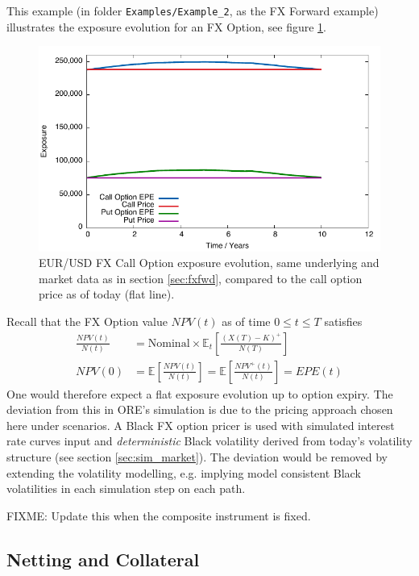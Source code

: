 \documentclass[12pt, a4paper]{article}
\newcommand\E{\ensuremath{\mathbb{E}}}
\newcommand{\EPE}{\mathit{EPE}}
\begin{document}
This example (in folder {\tt Examples/Example\_2}, as the FX Forward example) illustrates the exposure evolution for an FX Option, see figure \ref{fig_7}. 
\begin{figure}[hbt]
\begin{center}
\includegraphics[scale=1.0]{example_fxoption_fwdvariance_corrected.pdf}
\end{center}
\caption{EUR/USD FX Call Option exposure evolution, same underlying and market data as in section \ref{sec:fxfwd}, compared to the call option price as of today (flat line).}
\label{fig_7}
\end{figure}
Recall that the FX Option value $NPV(t)$ as of time $0 \leq t \leq T$ satisfies
\begin{align*}
\frac{NPV(t)}{N(t)} &= \mbox{Nominal}\times\E_t\left[\frac{(X(T) - K)^+}{N(T)}\right]\\
NPV(0) &= \E\left[\frac{NPV(t)}{N(t)}\right] = \E\left[\frac{NPV^+(t)}{N(t)} \right]= \EPE(t) 
\end{align*}
One would therefore expect a flat exposure evolution up to option expiry. The deviation from this in ORE's simulation is due to the pricing approach chosen here under scenarios. A Black FX option pricer is used with simulated interest rate curves input and {\em deterministic} Black volatility derived from today's volatility structure (see section \ref{sec:sim_market}). The deviation would be removed by extending the volatility modelling, e.g. implying model consistent Black volatilities in each simulation step on each path.
 
{\color{red}FIXME: Update this when the composite instrument is fixed.}

\subsection{Netting and Collateral}
\end{document}
